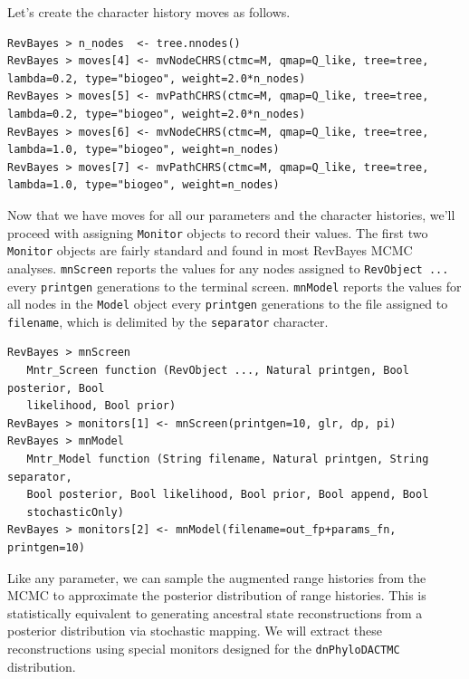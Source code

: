 \documentclass[11pt]{article}
\begin{document}
Let's create the character history moves as follows.

\begin{snugshade}
\begin{lstlisting}
RevBayes > n_nodes  <- tree.nnodes()
RevBayes > moves[4] <- mvNodeCHRS(ctmc=M, qmap=Q_like, tree=tree, lambda=0.2, type="biogeo", weight=2.0*n_nodes)
RevBayes > moves[5] <- mvPathCHRS(ctmc=M, qmap=Q_like, tree=tree, lambda=0.2, type="biogeo", weight=2.0*n_nodes)
RevBayes > moves[6] <- mvNodeCHRS(ctmc=M, qmap=Q_like, tree=tree, lambda=1.0, type="biogeo", weight=n_nodes)
RevBayes > moves[7] <- mvPathCHRS(ctmc=M, qmap=Q_like, tree=tree, lambda=1.0, type="biogeo", weight=n_nodes)
\end{lstlisting}
\end{snugshade}

Now that we have moves for all our parameters and the character histories, we'll proceed with assigning {\tt Monitor} objects to record their values.
The first two {\tt Monitor} objects are fairly standard and found in most RevBayes MCMC analyses.
{\tt mnScreen} reports the values for any nodes assigned to {\tt RevObject ...} every {\tt printgen} generations to the terminal screen.
{\tt mnModel} reports the values for all nodes in the {\tt Model} object every {\tt printgen} generations to the file assigned to {\tt filename}, which is delimited by the {\tt separator} character.

\begin{snugshade}
\begin{lstlisting}
RevBayes > mnScreen
   Mntr_Screen function (RevObject ..., Natural printgen, Bool posterior, Bool
   likelihood, Bool prior)
RevBayes > monitors[1] <- mnScreen(printgen=10, glr, dp, pi)
RevBayes > mnModel
   Mntr_Model function (String filename, Natural printgen, String separator,
   Bool posterior, Bool likelihood, Bool prior, Bool append, Bool
   stochasticOnly)
RevBayes > monitors[2] <- mnModel(filename=out_fp+params_fn, printgen=10)
\end{lstlisting}
\end{snugshade}

Like any parameter, we can sample the augmented range histories from the MCMC to approximate the posterior distribution of range histories.
This is statistically equivalent to generating ancestral state reconstructions from a posterior distribution via stochastic mapping.
We will extract these reconstructions using special monitors designed for the {\tt dnPhyloDACTMC} distribution.
\end{document}
